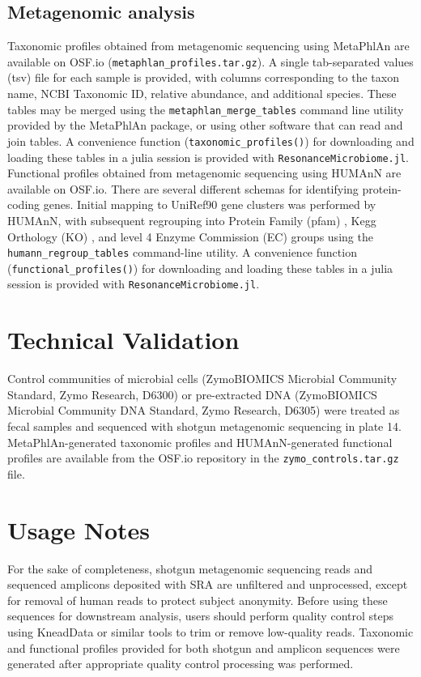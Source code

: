 \documentclass[fleqn,10pt]{wlscirep}
\begin{document}
\subsection*{Metagenomic analysis}

Taxonomic profiles obtained from metagenomic sequencing using MetaPhlAn are available on OSF.io (\verb|metaphlan_profiles.tar.gz|).
A single tab-separated values (tsv) file for each sample is provided,
with columns corresponding to the taxon name, NCBI Taxonomic ID, relative abundance, and additional species.
These tables may be merged using the \verb|metaphlan_merge_tables| command line utility provided by the MetaPhlAn package,
or using other software that can read and join tables.
A convenience function (\verb|taxonomic_profiles()|) for downloading and loading these tables in a julia session
is provided with \verb|ResonanceMicrobiome.jl|.
Functional profiles obtained from metagenomic sequencing using HUMAnN are available on OSF.io.
There are several different schemas for identifying protein-coding genes.
Initial mapping to UniRef90 \cite{UniProt_Consortium2010-ls} gene clusters was performed by HUMAnN,
with subsequent regrouping into Protein Family (pfam) \cite{Bateman2004-cz,El-Gebali2019-jh}, Kegg Orthology (KO) \cite{Kanehisa2000-rx,Kanehisa2008-gg},
and level 4 Enzyme Commission (EC) \cite{Bairoch2000-ot} groups using the \verb|humann_regroup_tables| command-line utility.
A convenience function (\verb|functional_profiles()|) for downloading and loading these tables in a julia session
is provided with \verb|ResonanceMicrobiome.jl|.

\section*{Technical Validation}

Control communities of microbial cells (ZymoBIOMICS Microbial Community Standard, Zymo Research, D6300)
or pre-extracted DNA (ZymoBIOMICS Microbial Community DNA Standard, Zymo Research, D6305)
were treated as fecal samples and sequenced with shotgun metagenomic sequencing in plate 14.
MetaPhlAn-generated taxonomic profiles and HUMAnN-generated functional profiles
are available from the OSF.io repository in the \verb|zymo_controls.tar.gz| file.

\section*{Usage Notes}

For the sake of completeness, shotgun metagenomic sequencing reads and sequenced amplicons deposited with SRA
are unfiltered and unprocessed, except for removal of human reads to protect subject anonymity.
Before using these sequences for downstream analysis, users should perform quality control steps
using KneadData or similar tools to trim or remove low-quality reads.
Taxonomic and functional profiles provided for both shotgun and amplicon sequences
were generated after appropriate quality control processing was performed. 
\end{document}
